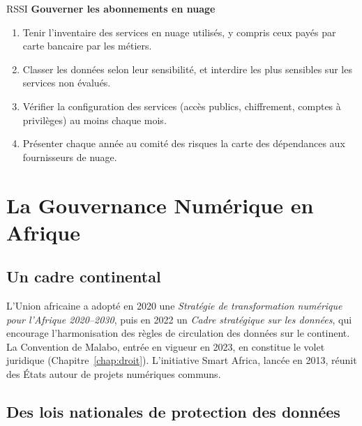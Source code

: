 \begin{boxmetier}{RSSI}
\textbf{Gouverner les abonnements en nuage}
\begin{enumerate}
    \item Tenir l'inventaire des services en nuage utilisés, y compris ceux
          payés par carte bancaire par les métiers.
    \item Classer les données selon leur sensibilité, et interdire les
          plus sensibles sur les services non évalués.
    \item Vérifier la configuration des services (accès publics, chiffrement,
          comptes à privilèges) au moins chaque mois.
    \item Présenter chaque année au comité des risques la carte des
          dépendances aux fournisseurs de nuage.
\end{enumerate}
\end{boxmetier}

\section{La Gouvernance Numérique en Afrique}
\label{sec:c18-afrique}

\subsection{Un cadre continental}

L'Union africaine a adopté en 2020 une \emph{Stratégie de transformation
numérique pour l'Afrique 2020--2030}, puis en 2022 un \emph{Cadre
stratégique sur les données}, qui encourage l'harmonisation des règles de
circulation des données sur le continent. La Convention de Malabo, entrée
en vigueur en 2023, en constitue le volet juridique
(Chapitre~\ref{chap:droit}). L'initiative Smart Africa, lancée en 2013,
réunit des États autour de projets numériques communs.

\subsection{Des lois nationales de protection des données}

